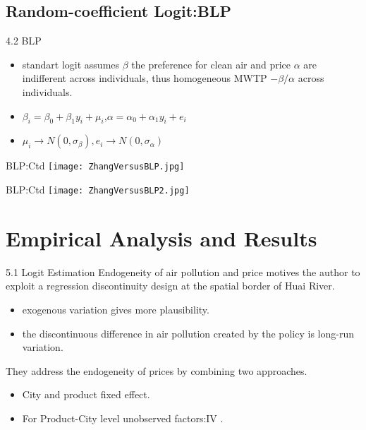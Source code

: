 \documentclass[10pt]{beamer}
\begin{document}
\subsection{Random-coefficient Logit:BLP}
\begin{frame}{4.2 BLP}
    \begin{itemize}
          \item     standart logit assumes $\beta$ the preference for clean air and price $\alpha$ are indifferent across individuals, thus homogeneous MWTP $-\beta/\alpha$ across individuals.
          \item $\beta_i = \beta_0+\beta_1 y_i +\mu_i$,$\alpha = \alpha_0 +\alpha_{1}y_i+e_i$
          \item $\mu_i\rightarrow N(0,\sigma_\beta),e_i\rightarrow N(0,\sigma_\alpha)$
      \end{itemize}
\end{frame}
\begin{frame}{BLP:Ctd}
    \texttt{[image: ZhangVersusBLP.jpg]}
\end{frame}
\begin{frame}{BLP:Ctd}
    \texttt{[image: ZhangVersusBLP2.jpg]}
\end{frame}
\section{Empirical Analysis and Results}
\begin{frame}{5.1 Logit Estimation}
	Endogeneity of air pollution and price motives the author to exploit a regression discontinuity design at the spatial border of Huai River.
	\begin{itemize}
		\item exogenous variation gives more plausibility.
		\item the discontinuous difference in air pollution created by the policy is long-run variation.
	\end{itemize}
	They address the endogeneity of prices by combining two approaches.
	\begin{itemize}
	    \item City and product fixed effect.
	    \item For Product-City level unobserved factors:IV .
	\end{itemize}
\end{frame}
\end{document}
